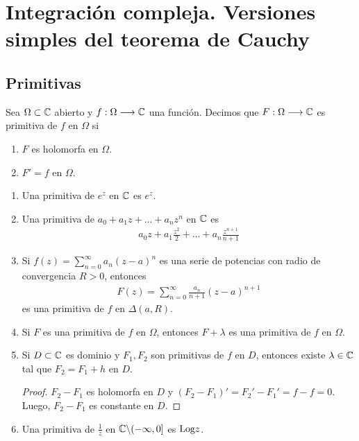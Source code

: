 \chapter{Integración compleja. Versiones simples del teorema de Cauchy}

\section{Primitivas}

\begin{defi}
    Sea $\Omega \subset \mathbb{C}$ abierto y $f: \Omega \longrightarrow \mathbb{C}$ una función. Decimos que $F : \Omega \longrightarrow \mathbb{C}$ es primitiva de $f$ en $\Omega$ si
    \begin{enumerate}
        \item $F$ es holomorfa en $\Omega$.
        \item $F' = f$ en $\Omega$.
    \end{enumerate}
\end{defi}

\begin{ejemplo}
    \begin{enumerate}
        \item Una primitiva de $e^z$ en $\mathbb{C}$ es $e^z$.
        \item Una primitiva de $a_0 + a_1z + ... + a_nz^n$ en $\mathbb{C}$ es
              \begin{align*}
                  a_0z + a_1\frac{z^2}{2} + ... + a_n \frac{z^{n+1}}{n+1}
              \end{align*}
        \item Si $f(z) = \sum_{n=0}^{\infty}{a_n(z-a)^n}$ es una serie de potencias con radio de convergencia $R > 0$, entonces
              \begin{align*}
                  F(z) =  \sum_{n=0}^{\infty}{\frac{a_n}{n+1}(z-a)^{n+1}}
              \end{align*}
              es una primitiva de $f$ en $\Delta(a,R)$.
        \item Si $F$ es una primitiva de $f$ en $\Omega$, entonces $F + \lambda$ es una primitiva de $f$ en $\Omega$.
        \item Si $D \subset \mathbb{C}$ es dominio y $F_1,F_2$ son primitivas de $f$ en $D$, entonces existe $\lambda \in \mathbb{C}$ tal que $F_2 = F_1 + h$ en $D$.
              \begin{proof}
                  $F_2 - F_1$ es holomorfa en $D$ y $(F_2 - F_1)' = F_2' - F_1' = f - f = 0$. Luego, $F_2 - F_1$ es constante en $D$.
              \end{proof}
        \item Una primitiva de $\frac{1}{z}$ en $\mathbb{C} \backslash (-\infty,0]$ es $\text{Log} z$.
    \end{enumerate}
\end{ejemplo}

